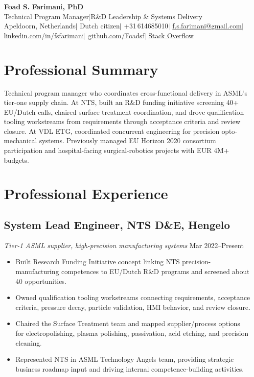 \documentclass[11pt,a4paper]{article}
\begin{document}
\begin{center}
 {\LARGE\bfseries Foad S. Farimani, PhD} \\[4pt]
 {\small Technical Program Manager\enspace$\mid$\enspace R\&D Leadership \& Systems Delivery}
 \\[6pt]
 {\small
  Apeldoorn, Netherlands\enspace$\mid$\enspace
  Dutch citizen\enspace$\mid$\enspace
  +31\,614685010\enspace$\mid$\enspace
  \href{mailto:f.s.farimani@gmail.com}{f.s.farimani@gmail.com}\enspace$\mid$\enspace
  \href{https://linkedin.com/in/fsfarimani}{linkedin.com/in/fsfarimani}\enspace$\mid$\enspace
  \href{https://github.com/Foadsf}{github.com/Foadsf}\enspace$\mid$\enspace
  \href{https://stackoverflow.com/users/4999991}{Stack Overflow}
 }
\end{center}

\section{Professional Summary}
Technical program manager who coordinates cross-functional delivery in ASML's tier-one supply chain. At NTS, built an R\&D funding initiative screening 40+ EU/Dutch calls, chaired surface treatment coordination, and drove qualification tooling workstreams from requirements through acceptance criteria and review closure. At VDL ETG, coordinated concurrent engineering for precision opto-mechanical systems. Previously managed EU Horizon 2020 consortium participation and hospital-facing surgical-robotics projects with EUR 4M+ budgets.

\section{Professional Experience}

\subsection{System Lead Engineer, NTS D\&E, Hengelo}
{\small\textit{Tier-1 ASML supplier, high-precision manufacturing systems}} \hfill {\small Mar 2022--Present}
\begin{itemize}
 \item Built Research Funding Initiative concept linking NTS precision-manufacturing competences to EU/Dutch R\&D programs and screened about 40 opportunities.
 \item Owned qualification tooling workstreams connecting requirements, acceptance criteria, pressure decay, particle validation, HMI behavior, and review closure.
 \item Chaired the Surface Treatment team and mapped supplier/process options for electropolishing, plasma polishing, passivation, acid etching, and precision cleaning.
 \item Represented NTS in ASML Technology Angels team, providing strategic business roadmap input and driving internal competence-building activities.
\end{itemize}
\end{document}
